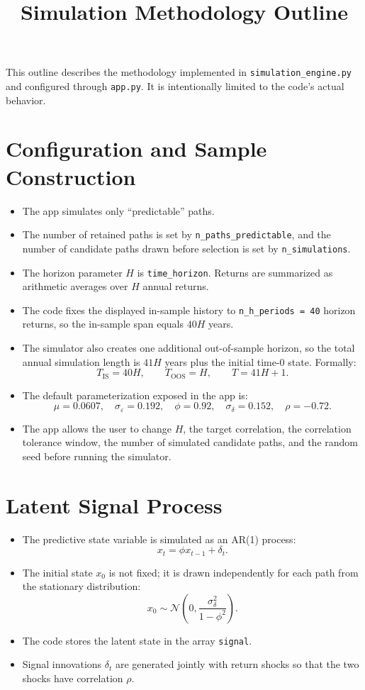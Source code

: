 \documentclass[11pt]{article}
\title{Simulation Methodology Outline}
\date{}
\begin{document}
\maketitle

\noindent This outline describes the methodology implemented in \texttt{simulation\_engine.py} and configured through \texttt{app.py}. It is intentionally limited to the code's actual behavior.

\section*{Configuration and Sample Construction}
\begin{itemize}
\item The app simulates only ``predictable'' paths.
\item The number of retained paths is set by \texttt{n\_paths\_predictable}, and the number of candidate paths drawn before selection is set by \texttt{n\_simulations}.
\item The horizon parameter \(H\) is \texttt{time\_horizon}. Returns are summarized as arithmetic averages over \(H\) annual returns.
\item The code fixes the displayed in-sample history to \texttt{n\_h\_periods = 40} horizon returns, so the in-sample span equals \(40H\) years.
\item The simulator also creates one additional out-of-sample horizon, so the total annual simulation length is \(41H\) years plus the initial time-\(0\) state. Formally:
\[
T_{\mathrm{IS}} = 40H,\qquad T_{\mathrm{OOS}} = H,\qquad T = 41H + 1.
\]
\item The default parameterization exposed in the app is:
\[
\mu = 0.0607,\quad \sigma_{\varepsilon} = 0.192,\quad \phi = 0.92,\quad \sigma_{\delta} = 0.152,\quad \rho = -0.72.
\]
\item The app allows the user to change \(H\), the target correlation, the correlation tolerance window, the number of simulated candidate paths, and the random seed before running the simulator.
\end{itemize}

\section*{Latent Signal Process}
\begin{itemize}
\item The predictive state variable is simulated as an AR(1) process:
\[
x_t = \phi x_{t-1} + \delta_t.
\]
\item The initial state \(x_0\) is not fixed; it is drawn independently for each path from the stationary distribution:
\[
x_0 \sim \mathcal{N}\!\left(0,\frac{\sigma_{\delta}^2}{1-\phi^2}\right).
\]
\item The code stores the latent state in the array \texttt{signal}.
\item Signal innovations \(\delta_t\) are generated jointly with return shocks so that the two shocks have correlation \(\rho\).
\end{itemize}
\end{document}
